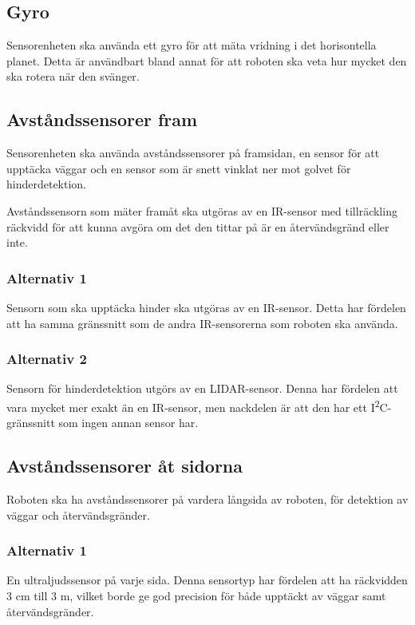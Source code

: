 \documentclass[a4paper,titlepage,12pt]{article}
\newcommand{\itc}{I\textsuperscript{2}C}
\begin{document}
	\subsection{Gyro}
	
	Sensorenheten ska använda ett gyro för att mäta vridning i det horisontella
	planet. Detta är användbart bland annat för att roboten ska veta hur mycket
	den ska rotera när den svänger.
	
	\subsection{Avståndssensorer fram}
	
	Sensorenheten ska använda avståndssensorer på framsidan, en sensor för att
	upptäcka väggar och en sensor som är snett vinklat ner mot golvet för hinderdetektion. 

	Avståndssensorn som mäter framåt ska utgöras av en IR-sensor med
	tillräckling räckvidd för att kunna avgöra om det den tittar på är en
	återvändsgränd eller inte.

	\subsubsection{Alternativ 1}

	Sensorn som ska upptäcka hinder ska utgöras av en IR-sensor. Detta
	har fördelen att ha samma gränssnitt som de andra IR-sensorerna som roboten
	ska använda.

	\subsubsection{Alternativ 2}

	Sensorn för hinderdetektion utgörs av en LIDAR-sensor. Denna har
	fördelen att vara mycket mer exakt än en IR-sensor, men nackdelen är att
	den har ett \itc{}-gränssnitt som ingen annan sensor har.

	\subsection{Avståndssensorer åt sidorna}
	Roboten ska ha avståndssensorer på vardera långsida av roboten, för
	detektion av väggar och återvändsgränder.

	\subsubsection{Alternativ 1}
	
	En ultraljudssensor på varje sida. Denna sensortyp har fördelen att ha
	räckvidden 3 cm till 3 m, vilket borde ge god precision för både upptäckt
	av väggar samt återvändsgränder.
\end{document}
